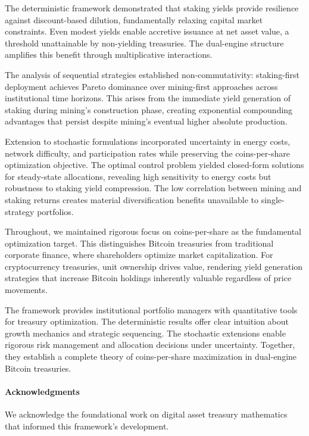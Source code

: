 \documentclass[
  journal=medium,
  manuscript=article-type,
  year=2025,
  volume=1,
]{cup-journal}
\theoremstyle{definition}
\begin{document}
The deterministic framework demonstrated that staking yields provide resilience against discount-based dilution, fundamentally relaxing capital market constraints. Even modest yields enable accretive issuance at net asset value, a threshold unattainable by non-yielding treasuries. The dual-engine structure amplifies this benefit through multiplicative interactions.

The analysis of sequential strategies established non-commutativity: staking-first deployment achieves Pareto dominance over mining-first approaches across institutional time horizons. This arises from the immediate yield generation of staking during mining's construction phase, creating exponential compounding advantages that persist despite mining's eventual higher absolute production.

Extension to stochastic formulations incorporated uncertainty in energy costs, network difficulty, and participation rates while preserving the coins-per-share optimization objective. The optimal control problem yielded closed-form solutions for steady-state allocations, revealing high sensitivity to energy costs but robustness to staking yield compression. The low correlation between mining and staking returns creates material diversification benefits unavailable to single-strategy portfolios.

Throughout, we maintained rigorous focus on coins-per-share as the fundamental optimization target. This distinguishes Bitcoin treasuries from traditional corporate finance, where shareholders optimize market capitalization. For cryptocurrency treasuries, unit ownership drives value, rendering yield generation strategies that increase Bitcoin holdings inherently valuable regardless of price movements.

The framework provides institutional portfolio managers with quantitative tools for treasury optimization. The deterministic results offer clear intuition about growth mechanics and strategic sequencing. The stochastic extensions enable rigorous risk management and allocation decisions under uncertainty. Together, they establish a complete theory of coins-per-share maximization in dual-engine Bitcoin treasuries.

\paragraph{Acknowledgments}
We acknowledge the foundational work on digital asset treasury mathematics that informed this framework's development.
\end{document}
